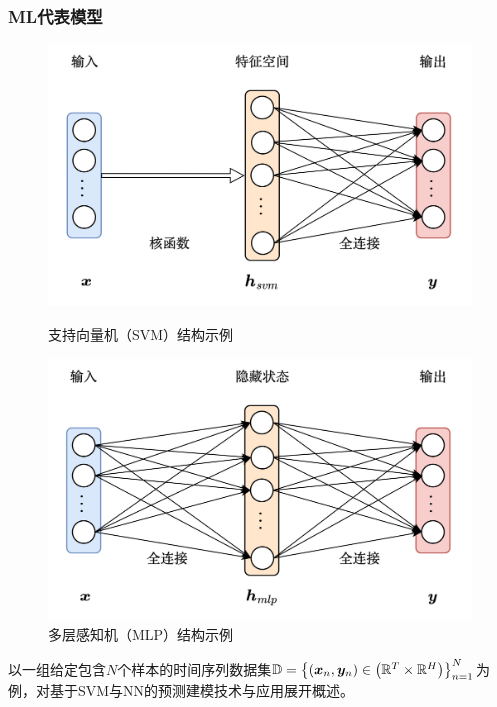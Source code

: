 \begin{frame}
    \frametitle{ML代表模型}

    \begin{figure}
        \begin{minipage}[b]{0.45\textwidth}
            \centering
            \includegraphics[width=\textwidth]{float/ch.intro/svm.png}
            \caption*{支持向量机（SVM）结构示例\label{fig:ch.intro.svm}}
        \end{minipage}
        \hfill
        \begin{minipage}[b]{0.45\textwidth}
            \centering
            \includegraphics[width=\textwidth]{float/ch.intro/mlp.png}
            \caption*{多层感知机（MLP）结构示例\label{fig:ch.intro.mlp}}
        \end{minipage}
    \end{figure}

    以一组给定包含\(N\)个样本的时间序列数据集\(\mathbb{D} = \left\{\left(\bm{x}_{n}, \bm{y}_{n}\right) \in\left(\mathbb{R}^{T} \times \mathbb{R}^{H}\right)\right\}_{n=1}^{N}\)为例，对基于SVM与NN的预测建模技术与应用展开概述。

\end{frame}

